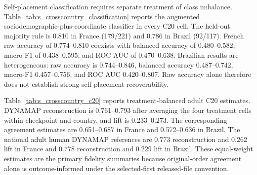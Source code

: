 \documentclass[unnumsec,webpdf,modern,large]{oup-authoring-template}
\begin{document}
\begin{table}[p]
\caption{All 24 primary C20 cross-country cells. Cue indicates whether political self-placement was present or ablated. Dyn. acc. is DYNAMAP validation accuracy; Majority is the condition-specific held-out majority-label accuracy; Lift is their difference; Matched human is decoded agreement with the corresponding human choice; and Displayed A is the fraction of responses selecting the visible A position. Under the selected-first released order, the per-cell Displayed A is determined by matched agreement; the order mean is therefore the positional statistic, with 0.5 indicating no letter-position concentration. No treatment averaging is applied to the other columns.}
\label{tab:s_crosscountry_all_cells}
\centering
\scriptsize
\resizebox{\textwidth}{!}{}
\end{table}

Self-placement classification requires separate treatment of class imbalance. Table~\ref{tab:s_crosscountry_classification} reports the augmented sociodemographic-plus-coordinate classifier in every C20 cell. The held-out majority rule is 0.810 in France (179/221) and 0.786 in Brazil (92/117). French raw accuracy of 0.774--0.810 coexists with balanced accuracy of 0.480--0.582, macro-F1 of 0.438--0.595, and ROC AUC of 0.470--0.638. Brazilian results are heterogeneous: raw accuracy is 0.744--0.846, balanced accuracy 0.487--0.742, macro-F1 0.457--0.756, and ROC AUC 0.420--0.807. Raw accuracy alone therefore does not establish strong self-placement recoverability.

\begin{table}[p]
\caption{Political self-placement classification in all 24 confirmed-adult primary C20 cells. Models use archived sociodemographic fields plus two DYNAMAP coordinates. Bal. acc. is the mean of left- and right-class recall; macro-F1 weights the two classes equally. Held-out sample sizes are 221 in France and 117 in Brazil; corresponding majority-rule accuracies are 0.810 and 0.786.}
\label{tab:s_crosscountry_classification}
\centering
\scriptsize
\resizebox{\textwidth}{!}{}
\end{table}

Table~\ref{tab:s_crosscountry_c20} reports treatment-balanced adult C20 estimates. DYNAMAP reconstruction is 0.761--0.793 after averaging the four treatment cells within checkpoint and country, and lift is 0.233--0.273. The corresponding agreement estimates are 0.651--0.687 in France and 0.572--0.636 in Brazil. The national adult human DYNAMAP references are 0.773 reconstruction and 0.262 lift in France and 0.778 reconstruction and 0.229 lift in Brazil. These equal-weight estimates are the primary fidelity summaries because original-order agreement alone is outcome-informed under the selected-first released-file convention.
\end{document}
